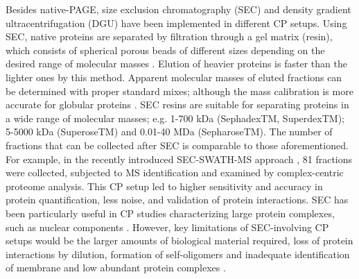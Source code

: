 Besides native-PAGE, size exclusion chromatography (SEC) and density gradient ultracentrifugation (DGU) have been implemented in different CP setups. Using SEC, native proteins are separated by filtration through a gel matrix (resin), which consists of spherical porous beads of different sizes depending on the desired range of molecular masses \cite{Burgess_2018}. Elution of heavier proteins is faster than the lighter ones by this method. Apparent molecular masses of eluted fractions can be determined with proper standard mixes; although the mass calibration is more accurate for globular proteins \cite{Hong_2012, Korepanova_2012}. SEC resins are suitable for separating proteins in a wide range of molecular masses; e.g. 1-700 kDa (SephadexTM, SuperdexTM); 5-5000 kDa (SuperoseTM) and 0.01-40 MDa (SepharoseTM). The number of fractions that can be collected after SEC is comparable to those aforementioned. For example, in the recently introduced SEC-SWATH-MS approach \cite{Heusel_2019}, 81 fractions were collected, subjected to MS identification and examined by complex-centric proteome analysis. This CP setup led to higher sensitivity and accuracy in protein quantification, less noise, and validation of protein interactions. SEC has been particularly useful in CP studies characterizing large protein complexes, such as nuclear components \cite{Connelly_2018}. However, key limitations of SEC-involving CP setups would be the larger amounts of biological material required, loss of protein interactions by dilution, formation of self-oligomers and inadequate identification of membrane and low abundant protein complexes \cite{Burgess_2018, Heusel_2019, Iacobucci_2021}.\\
